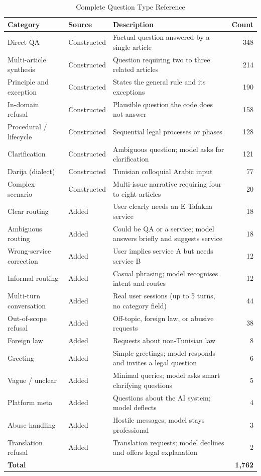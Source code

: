 \renewcommand{\arraystretch}{1.1}
\begin{table}[!ht]
\centering
\small
\caption{Complete Question Type Reference}
\label{tab:annex-question-types}
\begin{tabular}{|p{3.8cm}|p{2.8cm}|p{5.5cm}|r|}
\hline
\textbf{Category} & \textbf{Source} & \textbf{Description} & \textbf{Count} \\
\hline
Direct \ac{QA} & Constructed & Factual question answered by a single article & 348 \\
\hline
Multi-article synthesis & Constructed & Question requiring two to three related articles & 214 \\
\hline
Principle and exception & Constructed & States the general rule and its exceptions & 190 \\
\hline
In-domain refusal & Constructed & Plausible question the code does not answer & 158 \\
\hline
Procedural / lifecycle & Constructed & Sequential legal processes or phases & 128 \\
\hline
Clarification & Constructed & Ambiguous question; model asks for clarification & 121 \\
\hline
Darija (dialect) & Constructed & Tunisian colloquial Arabic input & 77 \\
\hline
Complex scenario & Constructed & Multi-issue narrative requiring four to eight articles & 20 \\
\hline
Clear routing & Added & User clearly needs an E-Tafakna service & 18 \\
\hline
Ambiguous routing & Added & Could be \ac{QA} or a service; model answers briefly and suggests service & 18 \\
\hline
Wrong-service correction & Added & User implies service A but needs service B & 12 \\
\hline
Informal routing & Added & Casual phrasing; model recognises intent and routes & 12 \\
\hline
Multi-turn conversation & Added & Real user sessions (up to 5 turns, no category field) & 44 \\
\hline
Out-of-scope refusal & Added & Off-topic, foreign law, or abusive requests & 38 \\
\hline
Foreign law & Added & Requests about non-Tunisian law & 8 \\
\hline
Greeting & Added & Simple greetings; model responds and invites a legal question & 6 \\
\hline
Vague / unclear & Added & Minimal queries; model asks smart clarifying questions & 5 \\
\hline
Platform meta & Added & Questions about the AI system; model deflects & 4 \\
\hline
Abuse handling & Added & Hostile messages; model stays professional & 3 \\
\hline
Translation refusal & Added & Translation requests; model declines and offers legal explanation & 2 \\
\hline
\textbf{Total} & & & \textbf{1,762} \\
\hline
\end{tabular}
\end{table}
